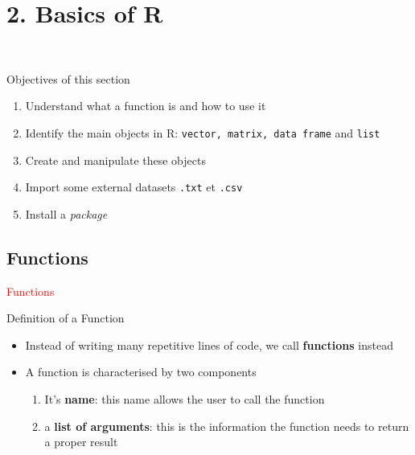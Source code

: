 \documentclass[11pt]{beamer}\usepackage[]{graphicx}\usepackage[]{color}
\newcommand{\code}[1]{\texttt{#1}}
\begin{document}
\section{2. Basics of R}

\begin{frame}[plain]
\hspace*{-1.0cm}\parbox[t]{\textwidth}{
 \begin{center}
  \Huge{\textcolor{white}{2. Basics of R}}
 \end{center}
 }
\end{frame}

\begin{frame}[plain]
\hspace*{-1.0cm}\parbox[t]{\textwidth}{
\begin{block}{Objectives of this section}
\begin{enumerate}
\item Understand what a function is and how to use it
\item Identify the main objects in R: \code{vector, matrix, data frame} and \code{list} 
\item Create and manipulate these objects
\item Import some external datasets \code{.txt} et \code{.csv}
\item Install a \textit{package}
\end{enumerate}
\end{block}
}
\end{frame}





\subsection{Functions}

\begin{frame}
 \begin{center}
  \Huge{\textcolor{red}{Functions}}
 \end{center}
\end{frame}



\begin{frame}{Definition of a Function}
\begin{itemize}
 \setlength\itemsep{2em}
\item Instead of writing many repetitive lines of code, we call \textbf{functions} instead
\pause \item A function is characterised by two components
\pause 
\begin{enumerate}
\normalsize
\item It's \textbf{name}: this name allows the user to call the function
\pause \item a \textbf{list of arguments}: this is the information the function needs to return a proper result
\end{enumerate}
\end{itemize}
\end{frame}
\end{document}
